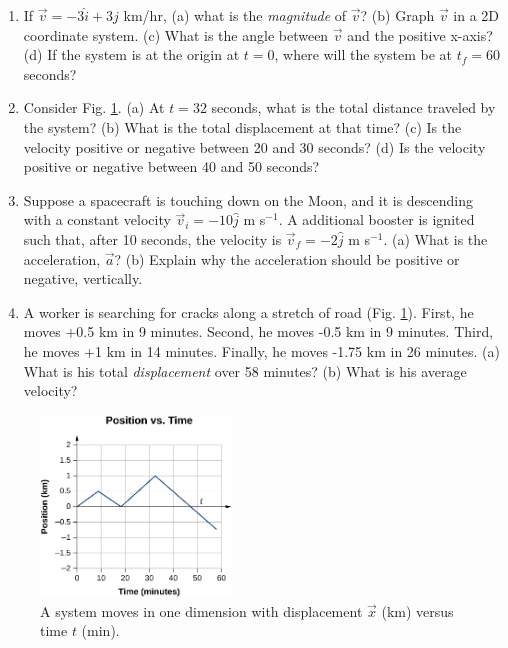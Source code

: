 \documentclass{article}
\begin{document}
\begin{enumerate}
\item If $\vec{v} = -3\hat{i} + 3\hat{j}$ km/hr, (a) what is the \textit{magnitude} of $\vec{v}$? (b) Graph $\vec{v}$ in a 2D coordinate system. (c) What is the angle between $\vec{v}$ and the positive x-axis? (d) If the system is at the origin at $t=0$, where will the system be at $t_f = 60$ seconds? \\ \vspace{4cm}
\item Consider Fig. \ref{fig:1}.  (a) At $t=32$ seconds, what is the total distance traveled by the system? (b) What is the total displacement at that time? (c) Is the velocity positive or negative between 20 and 30 seconds? (d) Is the velocity positive or negative between 40 and 50 seconds? \\ \vspace{2cm}
\item Suppose a spacecraft is touching down on the Moon, and it is descending with a constant velocity $\vec{v}_i = -10 \hat{j}$ m s$^{-1}$.  A additional booster is ignited such that, after 10 seconds, the velocity is $\vec{v}_f = -2 \hat{j}$ m s$^{-1}$.  (a) What is the acceleration, $\vec{a}$? (b) Explain why the acceleration should be positive or negative, vertically. \\ \vspace{2cm}
\item A worker is searching for cracks along a stretch of road (Fig. \ref{fig:1}).  First, he moves +0.5 km in 9 minutes.  Second, he moves -0.5 km in 9 minutes.  Third, he moves +1 km in 14 minutes.  Finally, he moves -1.75 km in 26 minutes.  (a) What is his total \textit{displacement} over 58 minutes? (b) What is his average velocity?
\end{enumerate}

\begin{figure}
\centering
\includegraphics[width=0.45\textwidth]{figures/graph_x_t.jpeg}
\caption{\label{fig:1} A system moves in one dimension with displacement $\vec{x}$ (km) versus time $t$ (min).}
\end{figure}
\end{document}
